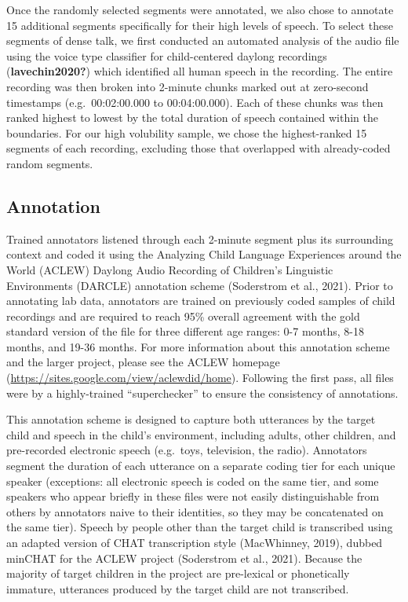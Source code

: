 \documentclass[
  man]{apa6}
\begin{document}
Once the randomly selected segments were annotated, we also chose to annotate 15 additional segments specifically for their high levels of speech. To select these segments of dense talk, we first conducted an automated analysis of the audio file using the voice type classifier for child-centered daylong recordings (\textbf{lavechin2020?}) which identified all human speech in the recording. The entire recording was then broken into 2-minute chunks marked out at zero-second timestamps (e.g.~00:02:00.000 to 00:04:00.000). Each of these chunks was then ranked highest to lowest by the total duration of speech contained within the boundaries. For our high volubility sample, we chose the highest-ranked 15 segments of each recording, excluding those that overlapped with already-coded random segments.

\hypertarget{annotation}{%
\subsection{Annotation}\label{annotation}}

Trained annotators listened through each 2-minute segment plus its surrounding context and coded it using the Analyzing Child Language Experiences around the World (ACLEW) Daylong Audio Recording of Children's Linguistic Environments (DARCLE) annotation scheme (Soderstrom et al., 2021). Prior to annotating lab data, annotators are trained on previously coded samples of child recordings and are required to reach 95\% overall agreement with the gold standard version of the file for three different age ranges: 0-7 months, 8-18 months, and 19-36 months. For more information about this annotation scheme and the larger project, please see the ACLEW homepage (\url{https://sites.google.com/view/aclewdid/home}). Following the first pass, all files were by a highly-trained ``superchecker'' to ensure the consistency of annotations.

This annotation scheme is designed to capture both utterances by the target child and speech in the child's environment, including adults, other children, and pre-recorded electronic speech (e.g.~toys, television, the radio). Annotators segment the duration of each utterance on a separate coding tier for each unique speaker (exceptions: all electronic speech is coded on the same tier, and some speakers who appear briefly in these files were not easily distinguishable from others by annotators naive to their identities, so they may be concatenated on the same tier). Speech by people other than the target child is transcribed using an adapted version of CHAT transcription style (MacWhinney, 2019), dubbed minCHAT for the ACLEW project (Soderstrom et al., 2021). Because the majority of target children in the project are pre-lexical or phonetically immature, utterances produced by the target child are not transcribed.
\end{document}
